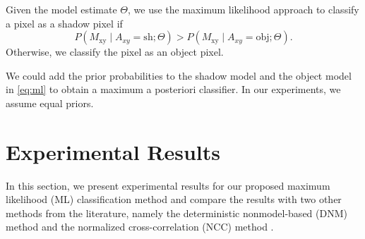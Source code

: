 Given the model estimate $\Theta$, we use the maximum likelihood
approach to classify a pixel as a shadow pixel if
\begin{equation}
  \label{eq:ml}
  P(M_{\text{xy}} \mid A_{xy}=\text{sh} ; \Theta ) >
  P(M_{\text{xy}} \mid A_{xy}=\text{obj} ; \Theta ).
\end{equation}
Otherwise, we classify the pixel as an object pixel.

We could add the prior probabilities to the shadow model and the
object model in \ref{eq:ml} to obtain a maximum a posteriori
classifier. In our experiments, we assume equal priors.

\section{Experimental Results}
\label{sec:shadow-results}

In this section, we present experimental results for our proposed
maximum likelihood (ML) classification method and compare the results
with two other methods from the literature, namely the deterministic
nonmodel-based (DNM)
method  and the normalized
cross-correlation (NCC)
method .

